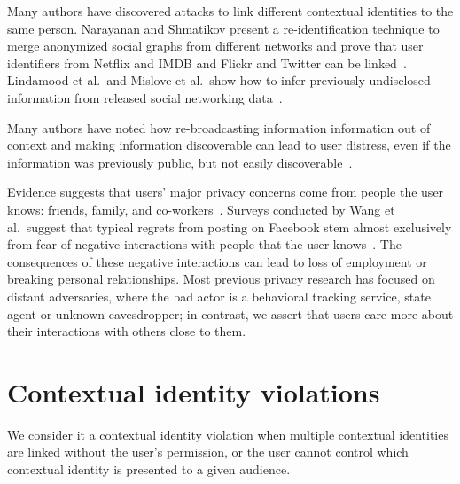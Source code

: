 \documentclass[10pt, conference, compsocconf]{IEEEtran}
\begin{document}
Many authors have discovered attacks to link different contextual identities to
the same person. Narayanan and Shmatikov present a re-identification technique
to merge anonymized social graphs from different networks and prove that
user identifiers from Netflix and IMDB and Flickr and Twitter can be
linked~\cite{narayanan1,narayanan2}. Lindamood et al.~and Mislove et al.~show
how to infer previously undisclosed information from released social networking
data~\cite{lindamood,mislove}.

Many authors have noted how re-broadcasting information information out of
context and making information discoverable can lead to user distress, even if
the information was previously public, but not easily
discoverable~\cite{boyd1,chew,nissenbaum}.

Evidence suggests that users' major privacy concerns come from people the user
knows: friends, family, and co-workers~\cite{fbtips2,fbtips1}.  Surveys
conducted by Wang et al.~suggest that typical regrets from posting on Facebook
stem almost exclusively from fear of negative interactions with people that the
user knows~\cite{wang}. The consequences of these negative interactions can
lead to loss of employment or breaking personal relationships.  Most previous
privacy research has focused on distant adversaries, where the bad actor is a
behavioral tracking service, state agent or unknown eavesdropper; in contrast,
we assert that users care more about their interactions with others close to
them.

\section{Contextual identity violations}
We consider it a contextual identity violation when
multiple contextual identities are linked without the user's permission, or the
user cannot control which contextual identity is presented to a given audience.

\label{sec:examples}
\end{document}
